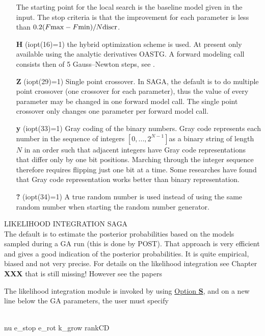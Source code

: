 \documentclass{saclantc}
\begin{document}
\begin{itemize}
The starting point for the local search is
the baseline model given in the input.
The stop criteria is that the improvement for each parameter is less than
$0.2 (F{\rm max}-F{\rm min}) /N{\rm discr}$.
\vspace{-0.3cm}
    \item[{\bf H}] (iopt(16)=1) the hybrid optimization scheme is used.
{ At present only available using the analytic derivatives {\sf OASTG}}.
A forward modeling call consists then of 5 Gauss--Newton steps,
 see \cite{gerstoft:asa95}.
\vspace{-0.3cm}
    \item[{\bf Z}] (iopt(29)=1) Single point crossover. In SAGA, the default is to do multiple point crossover (one crossover for each parameter), thus the value of every parameter may be changed in one forward model call. The single point crossover only changes one parameter per forward model call.
\vspace{-0.3cm}
    \item[{\bf y}] (iopt(33)=1) Gray  coding \cite{heitkoetter} of the binary numbers. 
Gray code represents each number in the sequence of integers
$[0,...,2^{N-1}]$as a binary string of length $N$ in an order such
that adjacent integers have Gray code representations that differ only
by one bit positions. Marching through the integer sequence therefore requires flipping just one bit at a time. Some researches have found that Gray code representation works better than binary representation. 
\vspace{-0.3cm}
    \item[{\bf ?}] (iopt(34)=1) A true random number is used instead
 of 
using  the same random
    number when starting the random number generator.
\end{itemize}

\noindent LIKELIHOOD INTEGRATION {\sf SAGA} \\
The default is to estimate the posterior probabilities based on the
models sampled during a GA run (this is done by {\sf POST}). That
approach is very efficient and gives a good indication of the
posterior probabilities. It is quite empirical, biased and not very
precise.
For details on the likelihood integration see Chapter {\bf XXX} that is still missing! However see  the papers \cite{yardim06,huang06,goh07}

The likelihood integration module is invoked by using
\underline{Option {\bf S}}, and on a new line below the GA parameters,
the user must specify
\\
\\
\begin{tt}
nu   e\_{stop} e\_{rot} k\_{grow}  rankCD
\end{tt}
\end{document}

